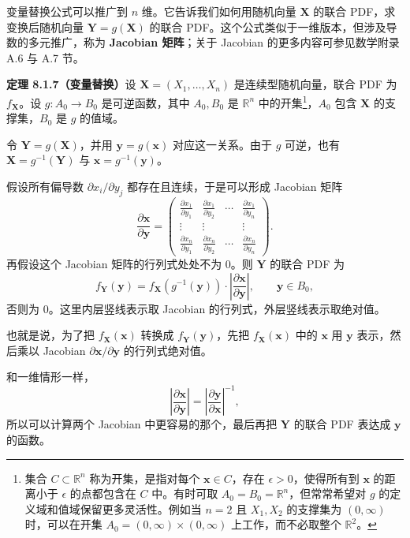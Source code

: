 \documentclass[UTF8, 12pt, fontset=fandol, oneside]{ctexart}
\begin{document}
变量替换公式可以推广到 $n$ 维。它告诉我们如何用随机向量 $\mathbf X$ 的联合 PDF，求变换后随机向量 $\mathbf Y=g(\mathbf X)$ 的联合 PDF。这个公式类似于一维版本，但涉及导数的多元推广，称为 \textbf{Jacobian 矩阵}；关于 Jacobian 的更多内容可参见数学附录 A.6 与 A.7 节。

\noindent\textbf{定理 8.1.7（变量替换）}\quad 设 $\mathbf X=(X_1,\ldots,X_n)$ 是连续型随机向量，联合 PDF 为 $f_{\mathbf X}$。设 $g:A_0\to B_0$ 是可逆函数，其中 $A_0,B_0$ 是 $\mathbb R^n$ 中的开集\footnote{集合 $C\subset\mathbb R^n$ 称为开集，是指对每个 $\mathbf x\in C$，存在 $\epsilon>0$，使得所有到 $\mathbf x$ 的距离小于 $\epsilon$ 的点都包含在 $C$ 中。有时可取 $A_0=B_0=\mathbb R^n$，但常常希望对 $g$ 的定义域和值域保留更多灵活性。例如当 $n=2$ 且 $X_1,X_2$ 的支撑集为 $(0,\infty)$ 时，可以在开集 $A_0=(0,\infty)\times(0,\infty)$ 上工作，而不必取整个 $\mathbb R^2$。}，$A_0$ 包含 $\mathbf X$ 的支撑集，$B_0$ 是 $g$ 的值域。

令 $\mathbf Y=g(\mathbf X)$，并用 $\mathbf y=g(\mathbf x)$ 对应这一关系。由于 $g$ 可逆，也有 $\mathbf X=g^{-1}(\mathbf Y)$ 与 $\mathbf x=g^{-1}(\mathbf y)$。

假设所有偏导数 $\partial x_i/\partial y_j$ 都存在且连续，于是可以形成 Jacobian 矩阵
\[
  \frac{\partial \mathbf x}{\partial \mathbf y}
  =
  \begin{pmatrix}
    \frac{\partial x_1}{\partial y_1} & \frac{\partial x_1}{\partial y_2} & \cdots & \frac{\partial x_1}{\partial y_n}\\
    \vdots & \vdots & & \vdots\\
    \frac{\partial x_n}{\partial y_1} & \frac{\partial x_n}{\partial y_2} & \cdots & \frac{\partial x_n}{\partial y_n}
  \end{pmatrix}.
\]
再假设这个 Jacobian 矩阵的行列式处处不为 $0$。则 $\mathbf Y$ 的联合 PDF 为
\[
  f_{\mathbf Y}(\mathbf y)
  =
  f_{\mathbf X}\left(g^{-1}(\mathbf y)\right)
  \cdot
  \left|\frac{\partial \mathbf x}{\partial \mathbf y}\right|,
  \qquad \mathbf y\in B_0,
\]
否则为 $0$。这里内层竖线表示取 Jacobian 的行列式，外层竖线表示取绝对值。

也就是说，为了把 $f_{\mathbf X}(\mathbf x)$ 转换成 $f_{\mathbf Y}(\mathbf y)$，先把 $f_{\mathbf X}(\mathbf x)$ 中的 $\mathbf x$ 用 $\mathbf y$ 表示，然后乘以 Jacobian $\partial\mathbf x/\partial\mathbf y$ 的行列式绝对值。

和一维情形一样，
\[
  \left|\frac{\partial\mathbf x}{\partial\mathbf y}\right|
  =
  \left|\frac{\partial\mathbf y}{\partial\mathbf x}\right|^{-1},
\]
所以可以计算两个 Jacobian 中更容易的那个，最后再把 $\mathbf Y$ 的联合 PDF 表达成 $\mathbf y$ 的函数。
\end{document}

